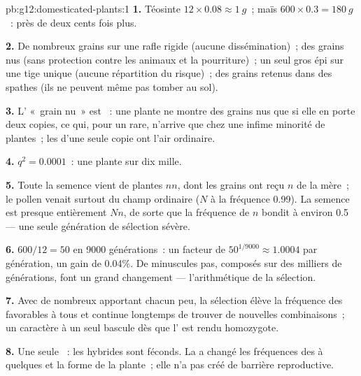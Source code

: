 \begin{solution}{pb:g12:domesticated-plants:1}
\textbf{1.} Téosinte $12 \times 0.08 \approx \qty{1}{g}$~; maïs $600
\times 0.3 = \qty{180}{g}$~: près de deux cents fois plus.

\textbf{2.} De nombreux grains sur une rafle rigide (aucune
dissémination)~; des grains nus (sans protection contre les animaux et
la pourriture)~; un seul gros épi sur une tige unique (aucune
répartition du risque)~; des grains retenus dans des spathes (ils ne
peuvent même pas tomber au sol).

\textbf{3.} L' «~grain nu~» est ~: une plante ne montre
des grains nus que si elle en porte deux copies, ce qui, pour un
 rare, n'arrive que chez une infime minorité de plantes~; les
 d'une seule copie ont l'air ordinaire.

\textbf{4.} $q^2 = 0.0001$~: une plante sur dix mille.

\textbf{5.} Toute la semence vient de plantes $nn$, dont les grains
ont reçu $n$ de la mère~; le pollen venait surtout du champ ordinaire
($N$ à la fréquence 0.99). La semence est presque entièrement $Nn$, de
sorte que la fréquence de $n$ bondit à environ 0.5 --- une seule
génération de sélection sévère.

\textbf{6.} $600/12 = 50$ en 9000 générations~: un facteur de $50^{1/9000}
\approx 1.0004$ par génération, un gain de 0.04\%. De minuscules pas,
composés sur des milliers de générations, font un grand
changement --- l'arithmétique de la sélection.

\textbf{7.} Avec de nombreux  apportant chacun peu, la sélection
élève la fréquence des  favorables à tous et continue longtemps
de trouver de nouvelles combinaisons~; un caractère à un seul 
bascule dès que l'  est rendu homozygote.

\textbf{8.} Une seule ~: les hybrides sont féconds. La
 a changé les fréquences des  à quelques  et
la forme de la plante~; elle n'a pas créé de barrière reproductive.


\end{solution}
